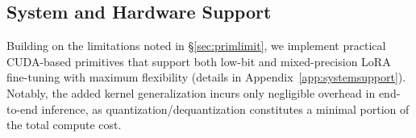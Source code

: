 

\subsection{System and Hardware Support}

Building on the limitations noted in \S\ref{sec:primlimit}, we implement practical CUDA-based primitives that support both low-bit and mixed-precision LoRA fine-tuning with maximum flexibility (details in Appendix~\ref{app:systemsupport}). Notably, the added kernel generalization incurs only negligible overhead in end-to-end inference, as quantization/dequantization constitutes a minimal portion of the total compute cost.